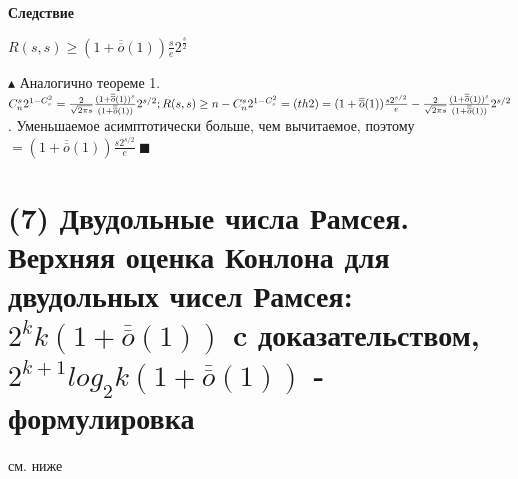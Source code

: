 \\
\\
\textbf{Следствие}
\begin{center}
    $R(s,s) \geqslant (1+\overline{\overline{o}}(1))\frac{s}{e}2^{\frac{s}{2}}$
\end{center}
$\blacktriangle$ Аналогично теореме 1. $C_n^s2^{1-C_s^2} = \frac{2}{\sqrt{2\pi s}}\frac{(1+\overline{\overline{o}}(1))^s}{(1+\overline{\overline{o}}(1))}2^{s/2}; \\ R(s,s) \geq n - C_n^s2^{1-C_s^2} = (th 2) = (1+\overline{\overline{o}}(1)) \frac{s2^{s/2}}{e} - \frac{2}{\sqrt{2\pi s}}\frac{(1+\overline{\overline{o}}(1))^s}{(1+\overline{\overline{o}}(1))}2^{s/2}$. Уменьшаемое асимптотически больше, чем вычитаемое, поэтому $= (1+\overline{\overline{o}}(1)) \frac{s2^{s/2}}{e} \ \blacksquare$
\section{(7) Двудольные числа Рамсея. Верхняя оценка Конлона для двудольных чисел Рамсея: $2
^k k(1+\overline{\overline{o}}(1))$
c доказательством, $2
^{k+1} log_2 k(1 + \overline{\overline{o}}(1))$ - формулировка}

см. ниже

